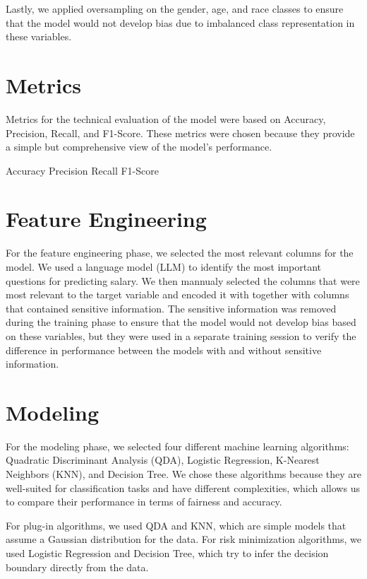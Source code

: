 \documentclass[conference]{IEEEtran}
\begin{document}
Lastly, we applied oversampling on the gender, age, and race classes to ensure that the model would not develop bias due to imbalanced class representation in these variables.

\section{Metrics}
Metrics for the technical evaluation of the model were based on Accuracy, Precision, Recall, and F1-Score. These metrics were chosen because they provide a simple but comprehensive view of the model's performance. 


Accuracy	Precision	Recall	F1-Score

\section{Feature Engineering}
For the feature engineering phase, we selected the most relevant columns for the model. We used a language model (LLM) to identify the most important questions for predicting salary. We then mannualy selected the columns that were most relevant to the target variable and encoded it with together with columns that contained sensitive information. The sensitive information was removed during the training phase to ensure that the model would not develop bias based on these variables, but they were used in a separate training session to verify the difference in performance between the models with and without sensitive information.

\section{Modeling}
For the modeling phase, we selected four different machine learning algorithms: Quadratic Discriminant Analysis (QDA), Logistic Regression, K-Nearest Neighbors (KNN), and Decision Tree. We chose these algorithms because they are well-suited for classification tasks and have different complexities, which allows us to compare their performance in terms of fairness and accuracy.

For plug-in algorithms, we used QDA and KNN, which are simple models that assume a Gaussian distribution for the data. For risk minimization algorithms, we used Logistic Regression and Decision Tree, which try to infer the decision boundary directly from the data.
\end{document}
